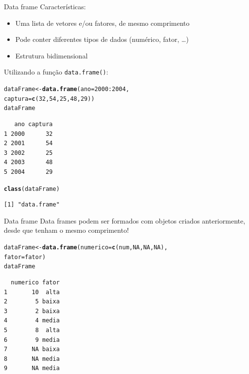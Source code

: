\documentclass[10pt,handout]{beamer}\usepackage[]{graphicx}\usepackage[]{color}
\makeatletter
\newcommand{\hlnum}[1]{\textcolor[rgb]{0.686,0.059,0.569}{#1}}%
\newcommand{\hlopt}[1]{\textcolor[rgb]{0,0,0}{#1}}%
\newcommand{\hlstd}[1]{\textcolor[rgb]{0.345,0.345,0.345}{#1}}%
\newcommand{\hlkwb}[1]{\textcolor[rgb]{0.69,0.353,0.396}{#1}}%
\newcommand{\hlkwc}[1]{\textcolor[rgb]{0.333,0.667,0.333}{#1}}%
\newcommand{\hlkwd}[1]{\textcolor[rgb]{0.737,0.353,0.396}{\textbf{#1}}}%
\newenvironment{kframe}{%
 \def\at@end@of@kframe{}%
 \ifinner\ifhmode%
  \def\at@end@of@kframe{\end{minipage}}%
  \begin{minipage}{\columnwidth}%
 \fi\fi%
 \def\FrameCommand##1{\hskip\@totalleftmargin \hskip-\fboxsep
 \colorbox{shadecolor}{##1}\hskip-\fboxsep
     \hskip-\linewidth \hskip-\@totalleftmargin \hskip\columnwidth}%
 \MakeFramed {\advance\hsize-\width
   \@totalleftmargin\z@ \linewidth\hsize
   \@setminipage}}%
 {\par\unskip\endMakeFramed%
 \at@end@of@kframe}
\newenvironment{knitrout}{}{} %
\makeatother
\begin{document}
\begin{frame}[fragile]{Data frame}
Características:
\begin{itemize}
\item Uma lista de vetores e/ou fatores, de mesmo comprimento
\item Pode conter diferentes tipos de dados (numérico, fator, \ldots)
\item Estrutura bidimensional
\end{itemize}
Utilizando a função \texttt{data.frame()}:
\begin{knitrout}\small
{}\color{fgcolor}\begin{kframe}
\begin{alltt}
\hlstd{dataFrame} \hlkwb{<-} \hlkwd{data.frame}\hlstd{(}\hlkwc{ano} \hlstd{=} \hlnum{2000}\hlopt{:}\hlnum{2004}\hlstd{,}
                        \hlkwc{captura} \hlstd{=} \hlkwd{c}\hlstd{(}\hlnum{32}\hlstd{,} \hlnum{54}\hlstd{,} \hlnum{25}\hlstd{,} \hlnum{48}\hlstd{,} \hlnum{29}\hlstd{))}
\hlstd{dataFrame}
\end{alltt}
\begin{verbatim}
   ano captura
1 2000      32
2 2001      54
3 2002      25
4 2003      48
5 2004      29
\end{verbatim}
\begin{alltt}
\hlkwd{class}\hlstd{(dataFrame)}
\end{alltt}
\begin{verbatim}
[1] "data.frame"
\end{verbatim}
\end{kframe}
\end{knitrout}
\end{frame}

\begin{frame}[fragile]{Data frame}
Data frames podem ser formados com objetos criados anteriormente, desde
que tenham o mesmo comprimento!
\begin{knitrout}\small
{}\color{fgcolor}\begin{kframe}
\begin{alltt}
\hlstd{dataFrame} \hlkwb{<-} \hlkwd{data.frame}\hlstd{(}\hlkwc{numerico} \hlstd{=} \hlkwd{c}\hlstd{(num,} \hlnum{NA}\hlstd{,} \hlnum{NA}\hlstd{,} \hlnum{NA}\hlstd{),}
                        \hlkwc{fator} \hlstd{= fator)}
\hlstd{dataFrame}
\end{alltt}
\begin{verbatim}
  numerico fator
1       10  alta
2        5 baixa
3        2 baixa
4        4 media
5        8  alta
6        9 media
7       NA baixa
8       NA media
9       NA media
\end{verbatim}
\end{kframe}
\end{knitrout}
\end{frame}
\end{document}
